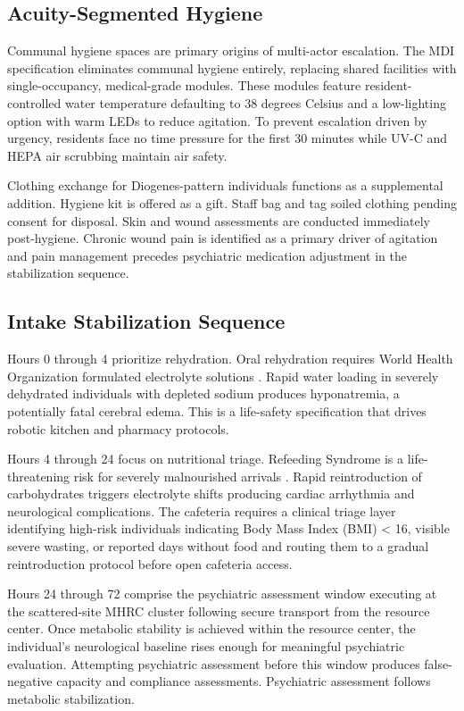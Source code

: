 \documentclass[12pt, letterpaper]{article}
\begin{document}
\subsection{Acuity-Segmented Hygiene}

Communal hygiene spaces are primary origins of multi-actor escalation. The MDI specification eliminates communal hygiene entirely, replacing shared facilities with single-occupancy, medical-grade modules. These modules feature resident-controlled water temperature defaulting to 38 degrees Celsius and a low-lighting option with warm LEDs to reduce agitation. To prevent escalation driven by urgency, residents face no time pressure for the first 30 minutes while UV-C and HEPA air scrubbing maintain air safety.

Clothing exchange for Diogenes-pattern individuals functions as a supplemental addition. Hygiene kit is offered as a gift. Staff bag and tag soiled clothing pending consent for disposal. Skin and wound assessments are conducted immediately post-hygiene. Chronic wound pain is identified as a primary driver of agitation and pain management precedes psychiatric medication adjustment in the stabilization sequence.

\subsection{Intake Stabilization Sequence}

Hours 0 through 4 prioritize rehydration. Oral rehydration requires World Health Organization formulated electrolyte solutions \citep{who_ors_2006}. Rapid water loading in severely dehydrated individuals with depleted sodium produces hyponatremia, a potentially fatal cerebral edema. This is a life-safety specification that drives robotic kitchen and pharmacy protocols.

Hours 4 through 24 focus on nutritional triage. Refeeding Syndrome is a life-threatening risk for severely malnourished arrivals \citep{refeeding_syndrome_2008}. Rapid reintroduction of carbohydrates triggers electrolyte shifts producing cardiac arrhythmia and neurological complications. The cafeteria requires a clinical triage layer identifying high-risk individuals indicating Body Mass Index (BMI) < 16, visible severe wasting, or reported days without food and routing them to a gradual reintroduction protocol before open cafeteria access.

Hours 24 through 72 comprise the psychiatric assessment window executing at the scattered-site MHRC cluster following secure transport from the resource center. Once metabolic stability is achieved within the resource center, the individual's neurological baseline rises enough for meaningful psychiatric evaluation. Attempting psychiatric assessment before this window produces false-negative capacity and compliance assessments. Psychiatric assessment follows metabolic stabilization.
\end{document}

